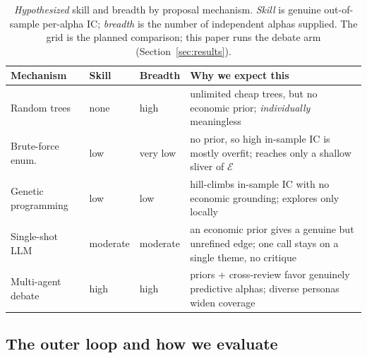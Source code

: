 \documentclass{article}
\theoremstyle{definition}
\theoremstyle{plain}
\theoremstyle{remark}
\newcommand{\Expr}{\mathcal{E}}
\newcommand{\IC}{\mathrm{IC}}
\begin{document}
\begin{table}[h]
\centering
\small
\begin{tabular}{@{}p{2.8cm}p{1.3cm}p{1.5cm}p{6.6cm}@{}}
\toprule
Mechanism & Skill & Breadth & Why we expect this \\
\midrule
Random trees        & none     & high     & unlimited cheap trees, but no economic prior; \emph{individually} meaningless \\
Brute-force enum.\  & low      & very low & no prior, so high in-sample $\IC$ is mostly overfit; reaches only a shallow sliver of $\Expr$ \\
Genetic programming & low      & low      & hill-climbs in-sample $\IC$ with no economic grounding; explores only locally \\
Single-shot LLM     & moderate & moderate & an economic prior gives a genuine but unrefined edge; one call stays on a single theme, no critique \\
Multi-agent debate  & high     & high     & priors + cross-review favor genuinely predictive alphas; diverse personas widen coverage \\
\bottomrule
\end{tabular}
\caption{\emph{Hypothesized} skill and breadth by proposal mechanism. \emph{Skill} is
genuine out-of-sample per-alpha $\IC$; \emph{breadth} is the number of independent
alphas supplied. The grid is the planned comparison; this paper runs the debate arm
(Section~\ref{sec:results}).}
\label{tab:skillbreadth}
\end{table}

\subsection{The outer loop and how we evaluate}
\label{sec:protocol}
\end{document}
